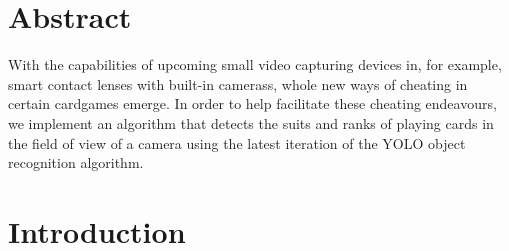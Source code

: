 \documentclass[a0,landscape]{a0poster}
\begin{document}
\vspace{1cm} %


\begin{multicols}{3} %


\color{Navy} %

\centering\section*{Abstract}
\raggedright	
\Large
With the capabilities of upcoming small video capturing devices in, for example, smart contact lenses with built-in camerass, whole new ways of cheating in certain cardgames emerge. In order to help facilitate these cheating endeavours, we implement an algorithm that detects the suits and ranks of playing cards in the field of view of a camera using the latest iteration of the YOLO object recognition algorithm.


\color{DarkSlateGray} %


\large
\section*{Introduction}


\end{multicols}
\end{document}
